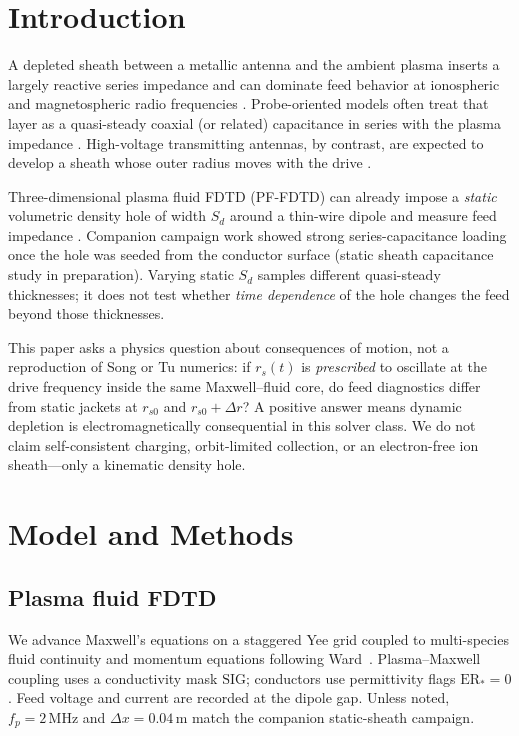 \documentclass[draft]{agujournal2025}
\begin{document}
\section{Introduction}
\label{sec:intro}

A depleted sheath between a metallic antenna and the ambient plasma inserts a largely reactive series impedance and can dominate feed behavior at ionospheric and magnetospheric radio frequencies
\cite{balmain1964,liu_sheath,song2007,tu2008}.
Probe-oriented models often treat that layer as a quasi-steady coaxial (or related) capacitance in series with the plasma impedance
\cite{liu_sheath}.
High-voltage transmitting antennas, by contrast, are expected to develop a sheath whose outer radius moves with the drive
\cite{song2007,tu2008}.

Three-dimensional plasma fluid FDTD (PF-FDTD) can already impose a \emph{static} volumetric density hole of width \(S_d\) around a thin-wire dipole and measure feed impedance
\cite{ward2006}.
Companion campaign work showed strong series-capacitance loading once the hole was seeded from the conductor surface (static sheath capacitance study in preparation).
Varying static \(S_d\) samples different quasi-steady thicknesses; it does not test whether \emph{time dependence} of the hole changes the feed beyond those thicknesses.

This paper asks a physics question about consequences of motion, not a reproduction of Song or Tu numerics:
if \(r_s(t)\) is \emph{prescribed} to oscillate at the drive frequency inside the same Maxwell--fluid core, do feed diagnostics differ from static jackets at \(r_{s0}\) and \(r_{s0}+\Delta r\)?
A positive answer means dynamic depletion is electromagnetically consequential in this solver class.
We do not claim self-consistent charging, orbit-limited collection, or an electron-free ion sheath---only a kinematic density hole.

\section{Model and Methods}
\label{sec:methods}

\subsection{Plasma fluid FDTD}
\label{sec:pffdtd}

We advance Maxwell's equations on a staggered Yee grid coupled to multi-species fluid continuity and momentum equations following Ward~\cite{ward2006}.
Plasma--Maxwell coupling uses a conductivity mask \(\mathrm{SIG}\); conductors use permittivity flags \(\mathrm{ER}_*=0\).
Feed voltage and current are recorded at the dipole gap.
Unless noted, \(f_p=2\,\mathrm{MHz}\) and \(\Delta x=0.04\,\mathrm{m}\) match the companion static-sheath campaign.
\end{document}
